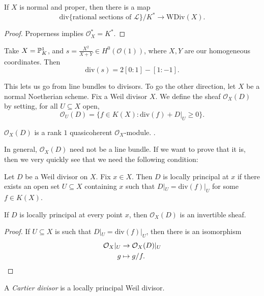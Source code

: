 \documentclass[a4paper]{article}
\renewcommand\div{\mathrm{div}}
\newcommand\WDiv{\mathrm{WDiv}}
\begin{document}
\begin{cor}
  If $X$ is normal and proper, then there is a map
  \[
    \div \{\text{rational sections of }\mathcal{L}\}/K^* \to \WDiv(X).
  \]
\end{cor}

\begin{proof}
  Properness implies $\mathcal{O}_X^* = K^*$.
\end{proof}

\begin{eg}
  Take $X = \P^1_K$, and $s = \frac{X^2}{X + Y} \in H^0(\mathcal{O}(1))$, where $X, Y$ are our homogeneous coordinates. Then
  \[
    \div(s) = 2[0:1] - [1:-1].
  \]
\end{eg}

This lets us go from line bundles to divisors. To go the other direction, let $X$ be a normal Noetherian scheme. Fix a Weil divisor $X$. We define the sheaf $\mathcal{O}_X(D)$ by setting, for all $U \subseteq X$ open,
\[
  \mathcal{O}_U(D) = \{f \in K(X) : \div(f) + D |_U \geq 0\}.
\]
\begin{prop}
  $\mathcal{O}_X(D)$ is a rank $1$ quasicoherent $\mathcal{O}_X$-module. \fakeqed.
\end{prop}

In general, $\mathcal{O}_X(D)$ need not be a line bundle. If we want to prove that it is, then we very quickly see that we need the following condition:
\begin{defi}
  Let $D$ be a Weil divisor on $X$. Fix $x \in X$. Then $D$ is locally principal at $x$ if there exists an open set $U \subseteq X$ containing $x$ such that $D|_U = \div(f)|_U$ for some $f \in K(X)$.
\end{defi}

\begin{prop}
  If $D$ is locally principal at every point $x$, then $\mathcal{O}_X(D)$ is an invertible sheaf.
\end{prop}
\begin{proof}
  If $U \subseteq X$ is such that $D|_U = \div(f)|_U$, then there is an isomorphism
  \begin{align*}
    \mathcal{O}_X|_U &\to \mathcal{O}_X(D) |_U\\
    g &\mapsto g/f.\qedhere
  \end{align*}
\end{proof}
\begin{defi}
  A \emph{Cartier divisor} is a locally principal Weil divisor.
\end{defi}
\end{document}
